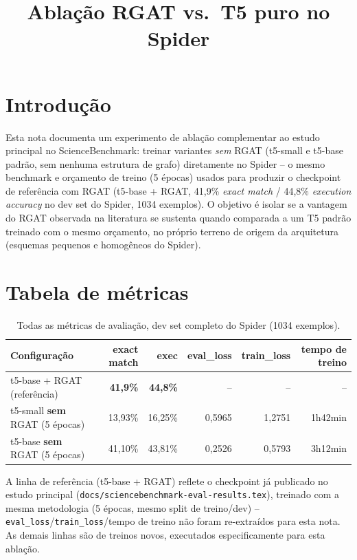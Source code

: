 \documentclass{article}
\title{Ablação RGAT vs.\ T5 puro no Spider}
\author{}
\date{}
\begin{document}
\maketitle

\section{Introdução}

Esta nota documenta um experimento de ablação complementar ao estudo principal
no ScienceBenchmark: treinar variantes \emph{sem} RGAT (t5-small e t5-base
padrão, sem nenhuma estrutura de grafo) diretamente no Spider -- o mesmo
benchmark e orçamento de treino (5 épocas) usados para produzir o checkpoint
de referência com RGAT (t5-base + RGAT, 41,9\% \emph{exact match} / 44,8\%
\emph{execution accuracy} no dev set do Spider, 1034 exemplos). O objetivo é
isolar se a vantagem do RGAT observada na literatura se sustenta quando
comparada a um T5 padrão treinado com o mesmo orçamento, no próprio terreno de
origem da arquitetura (esquemas pequenos e homogêneos do Spider).

\section{Tabela de métricas}

\begin{table}[h]
\centering
\caption{Todas as métricas de avaliação, dev set completo do Spider (1034 exemplos).}
\label{tab:spider-ablation}
\begin{tabular}{lrrrrr}
\toprule
\textbf{Configuração} & \textbf{exact match} & \textbf{exec} & \textbf{eval\_loss} & \textbf{train\_loss} & \textbf{tempo de treino} \\
\midrule
t5-base + RGAT (referência) & \textbf{41,9\%} & \textbf{44,8\%} & -- & -- & -- \\
t5-small \textbf{sem} RGAT (5 épocas) & 13,93\% & 16,25\% & 0,5965 & 1,2751 & 1h42min \\
t5-base \textbf{sem} RGAT (5 épocas) & 41,10\% & 43,81\% & 0,2526 & 0,5793 & 3h12min \\
\bottomrule
\end{tabular}

\vspace{0.4em}
{\footnotesize A linha de referência (t5-base + RGAT) reflete o checkpoint já
publicado no estudo principal (\texttt{docs/sciencebenchmark-eval-results.tex}),
treinado com a mesma metodologia (5 épocas, mesmo split de treino/dev) --
\texttt{eval\_loss}/\texttt{train\_loss}/tempo de treino não foram re-extraídos
para esta nota. As demais linhas são de treinos novos, executados
especificamente para esta ablação.}
\end{table}
\end{document}
